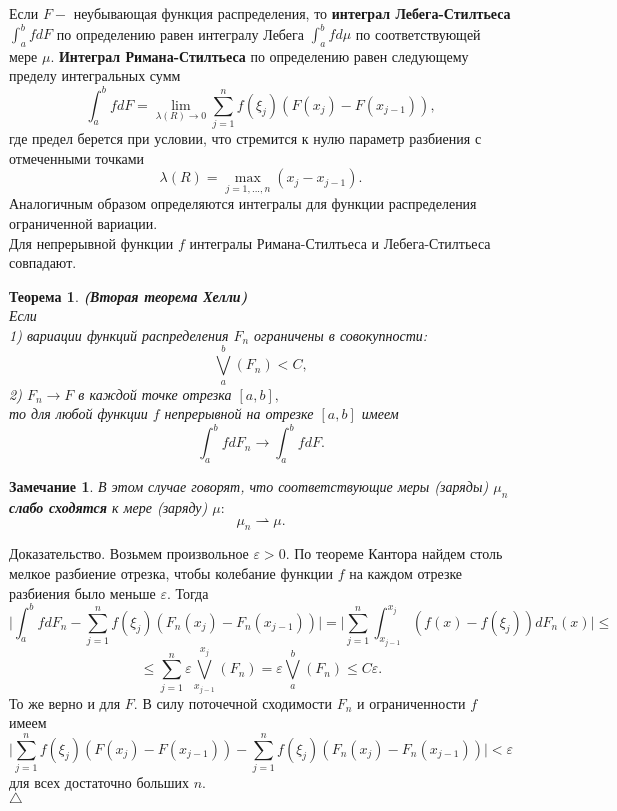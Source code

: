 \documentclass[12pt,a4paper]{article}
\theoremstyle{plain}   \newtheorem{Pro}{Задача}
\newtheorem{Rem}{Замечание}
\newtheorem{The}{Теорема}
\begin{document}
Если
$ F - $
неубывающая функция распределения, то
{\bfseries интеграл Лебега-Стилтьеса}
$ \int _a ^b f dF $
по определению равен интегралу Лебега
$ \int _a ^b f d \mu $
по соответствующей мере
$ \mu . $
{\bfseries Интеграл Римана-Стилтьеса}
по определению равен следующему пределу интегральных сумм
$$
  \int _a ^b fdF = \lim _{\lambda (R) \rightarrow 0}
  \sum _{j=1}^n f(\xi _j )
  (F(x_j )-F(x_{j-1})),
$$
где предел берется при условии, что стремится к нулю параметр
разбиения с отмеченными точками
$$
  \lambda (R) = \max _{j=1,...,n} (x_j -x_{j-1}).
$$
Аналогичным образом определяются интегралы для функции распределения
ограниченной вариации.\\
Для непрерывной функции
$ f $
интегралы Римана-Стилтьеса и Лебега-Стилтьеса совпадают.
\begin{The}
{\bfseries (Вторая теорема Хелли)}\\
Если\\
1) вариации функций распределения
$ F_n $
ограничены в совокупности:
$$
  \bigvee _a ^b (F_n )<C,
$$
2) $ F_n \rightarrow F $
в каждой точке отрезка
$ [a,b] , $
\\
то для любой функции
$ f $
непрерывной на отрезке
$ [a,b] $
имеем
$$
  \int _a ^b fdF_n \rightarrow \int _a ^b fdF .
$$
\end{The}
\begin{Rem}
В этом случае говорят, что соответствующие меры (заряды)
$ \mu _n $
{\bfseries слабо сходятся}
к мере (заряду)
$ \mu : $
$$
  \mu _n \rightharpoonup \mu .
$$
\end{Rem}
{\Large Доказательство.}
Возьмем произвольное
$ \varepsilon >0 . $
По теореме Кантора найдем столь мелкое разбиение отрезка,
чтобы колебание функции
$ f $
на каждом отрезке разбиения было меньше
$ \varepsilon . $
Тогда
$$
  \biggl | \int _a ^b fdF_n -
  \sum _{j=1}^n f(\xi _j )(F_n (x_j )-F_n (x_{j-1}))
  \biggr | = \biggl | \sum _{j=1}^n \int _{x_{j-1}}^{x_j}
  (f(x)-f(\xi _j ))dF_n (x) \biggr | \leq
$$
$$
  \leq \sum _{j=1}^n \varepsilon \bigvee _{x_{j-1}}^{x_j}
  (F_n ) = \varepsilon \bigvee _a ^b (F_n )
  \leq C \varepsilon .
$$
То же верно и для
$ F . $
В силу поточечной сходимости
$ F_n $
и ограниченности
$ f $
имеем
$$
  \biggl | \sum _{j=1}^n f(\xi _j )(F(x_j )-F(x_{j-1}))-
  \sum _{j=1}^n f(\xi _j )(F_n (x_j )-F_n (x_{j-1})) \biggr |
  < \varepsilon
$$
для всех достаточно больших
$ n . $\\
$ \triangle $
\end{document}

